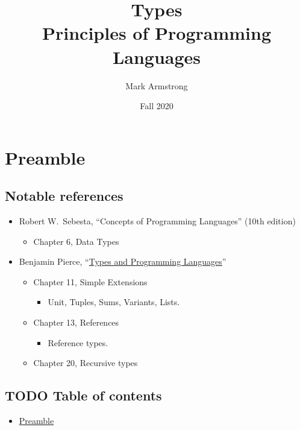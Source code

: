 \documentclass[11pt]{article}
\author{Mark Armstrong}
\date{Fall 2020}
\title{Types\\\medskip
\large Principles of Programming Languages}
\theoremstyle{definition}
\begin{document}
\maketitle

\section{Preamble}
\label{sec:org4ea34bc}

\subsection{Notable references}
\label{sec:orgd1e8925}

\begin{itemize}
\item Robert W. Sebesta, “Concepts of Programming Languages” (10th edition)
\begin{itemize}
\item Chapter 6, Data Types
\end{itemize}

\item Benjamin Pierce,
“\href{https://ebookcentral.proquest.com/lib/mcmu/detail.action?docID=3338823}{Types and Programming Languages}”
\begin{itemize}
\item Chapter 11, Simple Extensions
\begin{itemize}
\item Unit, Tuples, Sums, Variants, Lists.
\end{itemize}
\item Chapter 13, References
\begin{itemize}
\item Reference types.
\end{itemize}
\item Chapter 20, Recursive types
\end{itemize}
\end{itemize}

\subsection{{\bfseries\sffamily TODO} Table of contents}
\label{sec:org7b6e1ad}

\begin{scriptsize}
\begin{itemize}
\item \hyperref[sec:org4ea34bc]{Preamble}
\end{itemize}
\end{scriptsize}
\end{document}
